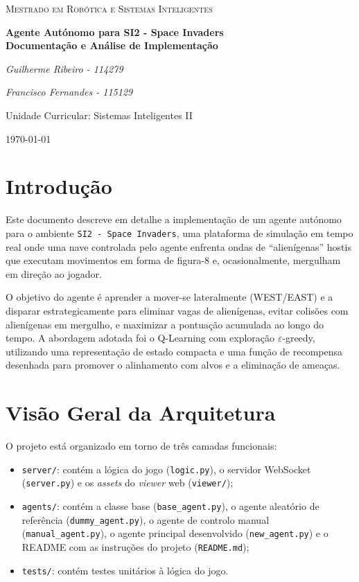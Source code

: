 \documentclass[12pt,a4paper]{article}
\begin{document}
\begin{titlepage}
    \centering
    {\scshape\Large Mestrado em Robótica e Sistemas Inteligentes\par}
    \vspace{1.5cm}
    {\huge\bfseries Agente Autónomo para SI2 - Space Invaders\\[0.3cm]
    \large Documentação e Análise de Implementação\par}
    \vspace{2cm}
    {\Large\itshape Guilherme Ribeiro - 114279\par}
    {\Large\itshape Francisco Fernandes - 115129\par}
    \vfill
    Unidade Curricular: Sistemas Inteligentes II\par
    \vspace{0.5cm}
    {\large \today\par}
\end{titlepage}

\section{Introdução}

Este documento descreve em detalhe a implementação de um agente autónomo para o ambiente \texttt{SI2~-~Space~Invaders}, uma plataforma de simulação em tempo real onde uma nave controlada pelo agente enfrenta ondas de ``alienígenas'' hostis que executam movimentos em forma de figura-8 e, ocasionalmente, mergulham em direção ao jogador. 

O objetivo do agente é aprender a mover-se lateralmente (WEST/EAST) e a disparar estrategicamente para eliminar vagas de alienígenas, evitar colisões com alienígenas em mergulho, e maximizar a pontuação acumulada ao longo do tempo. A abordagem adotada foi o Q-Learning com exploração $\varepsilon$-greedy, utilizando uma representação de estado compacta e uma função de recompensa desenhada para promover o alinhamento com alvos e a eliminação de ameaças.

\section{Visão Geral da Arquitetura}

O projeto está organizado em torno de três camadas funcionais:

\begin{itemize}
    \item \texttt{server/}: contém a lógica do jogo (\texttt{logic.py}), o servidor WebSocket (\texttt{server.py}) e os \textit{assets} do \textit{viewer} web (\texttt{viewer/});
    \item \texttt{agents/}: contém a classe base (\texttt{base\_agent.py}), o agente aleatório de referência (\texttt{dummy\_agent.py}), o agente de controlo manual (\texttt{manual\_agent.py}), o agente principal desenvolvido (\texttt{new\_agent.py}) e o README com as instruções do projeto (\texttt{README.md});
    \item \texttt{tests/}: contém testes unitários à lógica do jogo.
\end{itemize}
\end{document}
